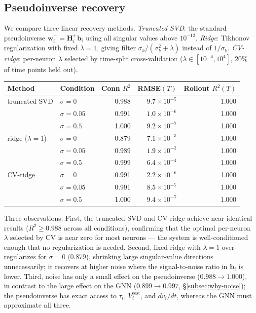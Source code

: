 \documentclass[11pt,a4paper]{article}
\begin{document}
\subsection{Pseudoinverse recovery}
\label{subsec:pseudoinverse}

We compare three linear recovery methods. \emph{Truncated SVD}: the standard pseudoinverse $\mathbf{w}_i^+ = \mathbf{H}_i^+ \mathbf{b}_i$ using all singular values above $10^{-12}$. \emph{Ridge}: Tikhonov regularization with fixed $\lambda = 1$, giving filter $\sigma_k / (\sigma_k^2 + \lambda)$ instead of $1/\sigma_k$. \emph{CV-ridge}: per-neuron $\lambda$ selected by time-split cross-validation ($\lambda \in [10^{-4}, 10^{4}]$, 20\% of time points held out).

\begin{center}
\begin{tabular}{llrrr}
\toprule
Method & Condition & Conn $R^2$ & RMSE$(T)$ & Rollout $R^2(T)$ \\
\midrule
truncated SVD & $\sigma = 0$    & 0.988 & $9.7 \times 10^{-5}$ & 1.000 \\
              & $\sigma = 0.05$ & 0.991 & $1.0 \times 10^{-6}$ & 1.000 \\
              & $\sigma = 0.5$  & 1.000 & $9.2 \times 10^{-7}$ & 1.000 \\
\midrule
ridge ($\lambda=1$) & $\sigma = 0$    & 0.879 & $7.1 \times 10^{-3}$ & 1.000 \\
                    & $\sigma = 0.05$ & 0.989 & $1.9 \times 10^{-3}$ & 1.000 \\
                    & $\sigma = 0.5$  & 0.999 & $6.4 \times 10^{-4}$ & 1.000 \\
\midrule
CV-ridge & $\sigma = 0$    & 0.991 & $2.2 \times 10^{-6}$ & 1.000 \\
         & $\sigma = 0.05$ & 0.991 & $8.5 \times 10^{-7}$ & 1.000 \\
         & $\sigma = 0.5$  & 1.000 & $9.4 \times 10^{-7}$ & 1.000 \\
\bottomrule
\end{tabular}
\end{center}

Three observations. First, the truncated SVD and CV-ridge achieve near-identical results ($R^2 \geq 0.988$ across all conditions), confirming that the optimal per-neuron $\lambda$ selected by CV is near zero for most neurons — the system is well-conditioned enough that no regularization is needed. Second, fixed ridge with $\lambda = 1$ over-regularizes for $\sigma = 0$ (0.879), shrinking large singular-value directions unnecessarily; it recovers at higher noise where the signal-to-noise ratio in $\mathbf{b}_i$ is lower. Third, noise has only a small effect on the pseudoinverse ($0.988 \to 1.000$), in contrast to the large effect on the GNN ($0.899 \to 0.997$, \S\ref{subsec:why-noise}); the pseudoinverse has exact access to $\tau_i$, $V_i^{\mathrm{rest}}$, and $dv_i/dt$, whereas the GNN must approximate all three.
\end{document}
